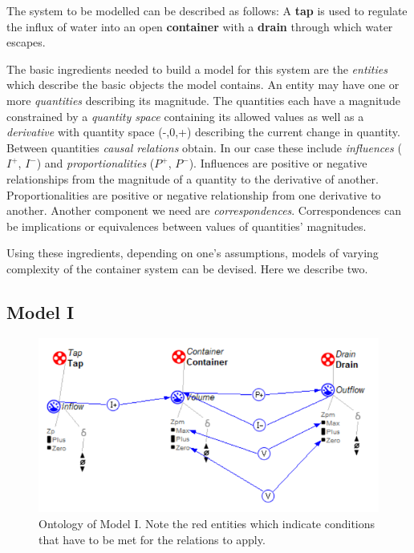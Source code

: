\documentclass{article}
\begin{document}
The system to be modelled can be described as follows: A \textbf{tap} is used to regulate the influx of water into an open \textbf{container} with a \textbf{drain} through which water escapes.

The basic ingredients needed to build a model for this system are the \textit{entities} which describe the basic objects the model contains. An entity may have one or more \textit{quantities} describing its magnitude. The quantities each have a magnitude constrained by a \textit{quantity space} containing its allowed values as well as a \textit{derivative} with quantity space (-,0,+) describing the current change in quantity. Between quantities \textit{causal relations} obtain. In our case these include \textit{influences} ($I^+$, $I^-$) and \textit{proportionalities} ($P^+$, $P^-$). Influences are positive or negative relationships from the magnitude of a quantity to the derivative of another. Proportionalities are positive or negative relationship from one derivative to another.
Another component we need are \textit{correspondences}. Correspondences can be implications or equivalences between values of quantities' magnitudes.

Using these ingredients, depending on one's assumptions, models of varying complexity of the container system can be devised. Here we describe two. 



\subsection {Model I}

\begin{figure}[!h]
	\centering
	\includegraphics{Simple_Flow.png}
	\caption{Ontology of Model I. Note the red entities which indicate conditions that have to be met for the relations to apply.}
	\label{fig: figure1}
\end{figure}
\end{document}
